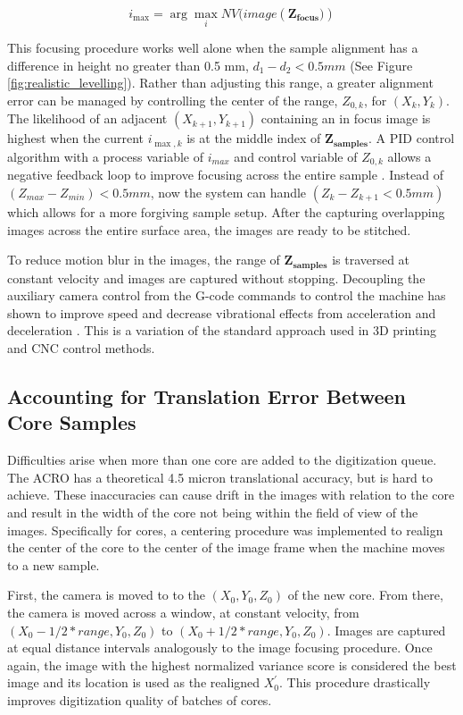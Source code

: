 \documentclass[a4paper,12pt]{article}
\begin{document}
\[
  i_{\max} = \arg\max_{i} NV(image(\boldsymbol{{Z_\text{focus}})})
  \]

This focusing procedure works well alone when the sample alignment has a difference in height no greater than 0.5 mm, $d_1 - d_2 < 0.5 mm $ (See Figure \ref{fig:realistic_levelling}). 
Rather than adjusting this range, a greater alignment error can be managed by controlling the center of the range, $Z_{0,k}$, for $(X_k,Y_k)$. 
The likelihood of an adjacent $(X_{k+1}, Y_{k+1})$ containing an in focus image is highest when the current $i_{{\max,k}}$ is at the middle index of $\boldsymbol{Z_{samples}}$. 
A PID control algorithm with a process variable of $i_{max}$ and control variable of $Z_{0,k}$ allows a negative feedback loop to improve focusing across the entire sample \citep{odwyer_summary_2000}. 
Instead of $(Z_{max} - Z_{min}) < 0.5mm$, now the system can handle $(Z_{k} - Z_{k+1} < 0.5mm)$ which allows for a more forgiving sample setup. After the capturing overlapping images across the entire surface area, the images are ready to be stitched.

To reduce motion blur in the images, the range of $\boldsymbol{Z_{\text{samples}}}$ is traversed at constant velocity and images are captured without stopping. 
Decoupling the auxiliary camera control from the G-code commands to control the machine has shown to improve speed and decrease vibrational effects from acceleration and deceleration \citep{propst_time_2025}.
This is a variation of the standard approach used in 3D printing and CNC control methods. 
  
\subsection{Accounting for Translation Error Between Core Samples}

Difficulties arise when more than one core are added to the digitization queue.
The ACRO has a theoretical 4.5 micron translational accuracy, but is hard to achieve.
These inaccuracies can cause drift in the images with relation to the core and result in the width of the core not being within the field of view of the images.
Specifically for cores, a centering procedure was implemented to realign the center of the core to the center of the image frame when the machine moves 
to a new sample. 

First, the camera is moved to to the $(X_0, Y_0, Z_0)$ of the new core. 
From there, the camera is moved across a window, at constant velocity, from $(X_0 - 1/2*{range}, Y_0, Z_0)$ to $(X_0 + 1/2*{range}, Y_0, Z_0)$. 
Images are captured at equal distance intervals analogously to the image focusing procedure. 
Once again, the image with the highest normalized variance score is considered the best image and its location is used as the realigned $X_0^\prime$.
This procedure drastically improves digitization quality of batches of cores.
\end{document}
